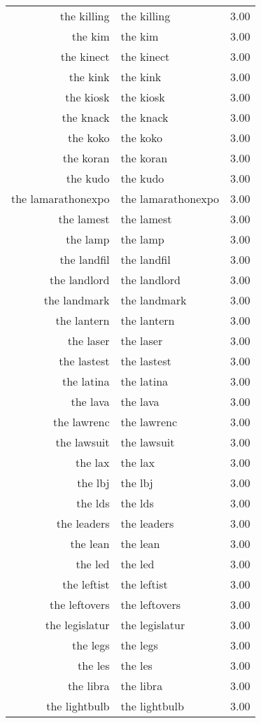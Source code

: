 \begin{table}[ht]
\begin{tabular}{rlr}
  the killing & the killing & 3.00 \\ 
  the kim & the kim & 3.00 \\ 
  the kinect & the kinect & 3.00 \\ 
  the kink & the kink & 3.00 \\ 
  the kiosk & the kiosk & 3.00 \\ 
  the knack & the knack & 3.00 \\ 
  the koko & the koko & 3.00 \\ 
  the koran & the koran & 3.00 \\ 
  the kudo & the kudo & 3.00 \\ 
  the lamarathonexpo & the lamarathonexpo & 3.00 \\ 
  the lamest & the lamest & 3.00 \\ 
  the lamp & the lamp & 3.00 \\ 
  the landfil & the landfil & 3.00 \\ 
  the landlord & the landlord & 3.00 \\ 
  the landmark & the landmark & 3.00 \\ 
  the lantern & the lantern & 3.00 \\ 
  the laser & the laser & 3.00 \\ 
  the lastest & the lastest & 3.00 \\ 
  the latina & the latina & 3.00 \\ 
  the lava & the lava & 3.00 \\ 
  the lawrenc & the lawrenc & 3.00 \\ 
  the lawsuit & the lawsuit & 3.00 \\ 
  the lax & the lax & 3.00 \\ 
  the lbj & the lbj & 3.00 \\ 
  the lds & the lds & 3.00 \\ 
  the leaders & the leaders & 3.00 \\ 
  the lean & the lean & 3.00 \\ 
  the led & the led & 3.00 \\ 
  the leftist & the leftist & 3.00 \\ 
  the leftovers & the leftovers & 3.00 \\ 
  the legislatur & the legislatur & 3.00 \\ 
  the legs & the legs & 3.00 \\ 
  the les & the les & 3.00 \\ 
  the libra & the libra & 3.00 \\ 
  the lightbulb & the lightbulb & 3.00 \\ 

\end{tabular}
\end{table}
